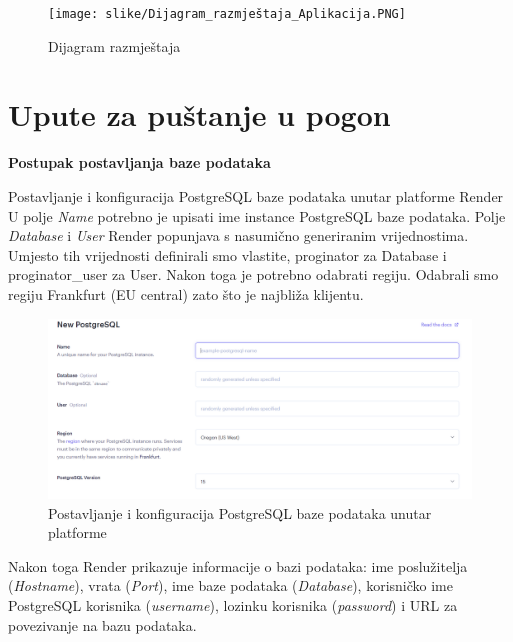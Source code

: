 			 \begin{figure}[H]
				\texttt{[image: slike/Dijagram\_razmještaja\_Aplikacija.PNG]} %
				\centering
				\caption{Dijagram razmještaja}
				\label{fig:dijagram_razmjestaja1}
			\end{figure}
			
			\eject 
		
		\section{Upute za puštanje u pogon}
	

\textbf{Postupak postavljanja baze podataka}

    \begin{packed_item}
		\item Postavljanje i konfiguracija PostgreSQL baze podataka unutar platforme Render \\
		
		U polje \textit{Name} potrebno je upisati ime instance PostgreSQL baze podataka. Polje \textit{Database} i \textit{User} Render popunjava s nasumično generiranim vrijednostima. Umjesto tih vrijednosti definirali smo vlastite, proginator za Database i proginator\_user za User. Nakon toga je potrebno odabrati regiju. Odabrali smo regiju Frankfurt (EU central) zato što je najbliža klijentu. 
		
		\begin{figure}[H]
			\includegraphics[width=\textwidth]{slike/Baza_podataka1.PNG} %
			\caption{Postavljanje i konfiguracija PostgreSQL baze podataka unutar platforme}
			\label{fig:bazapodataka1} %
		\end{figure}
		
		Nakon toga Render prikazuje informacije o bazi podataka: ime poslužitelja (\textit{Hostname}), vrata (\textit{Port}), ime baze podataka (\textit{Database}), korisničko ime PostgreSQL korisnika (\textit{username}), lozinku korisnika (\textit{password}) i URL za povezivanje na bazu podataka. 
		

\end{packed_item}
